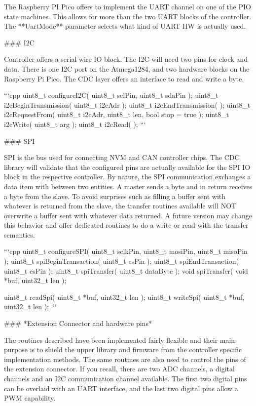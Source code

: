 The Raspberry PI Pico offers to implement the UART channel on one of the PIO state machines. This allows for more than the two UART blocks of the controller. The **UartMode** parameter selects what kind of UART HW is actually used.

### I2C

Controller offers a serial wire IO block. The I2C will need two pins for clock and data. There is one I2C port on the Atmega1284, and two hardware blocks on the Raspberry Pi Pico. The CDC layer offers an interface to read and write a byte.

```cpp
   uint8_t       configureI2C( uint8_t sclPin, uint8_t sdaPin );
   uint8_t       i2cBeginTransmission( uint8_t i2cAdr );
   uint8_t       i2cEndTransmission( );
   uint8_t       i2cRequestFrom( uint8_t i2cAdr, uint8_t len, bool stop = true );
   uint8_t       i2cWrite( uint8_t arg );
   uint8_t       i2cRead( );
```

### SPI

SPI is the bus used for connecting NVM and CAN controller chips. The CDC library will validate that the configured pins are actually available for the SPI IO block in the respective controller. By nature, the SPI communication exchanges a data item with between two entities. A master sends a byte and in return receives a byte from the slave. To avoid surprises such as filling a buffer sent with whatever is returned from the slave, the transfer routines available will NOT overwrite a buffer sent with whatever data returned. A future version may change this behavior and offer dedicated routines to do a write or read with the transfer semantics.

```cpp
   uint8_t       configureSPI( uint8_t sclkPin, uint8_t mosiPin, uint8_t misoPin );
   uint8_t       spiBeginTransaction( uint8_t csPin );
   uint8_t       spiEndTransaction( uint8_t csPin );
   uint8_t       spiTransfer( uint8_t dataByte );
   void          spiTransfer( void *buf, uint32_t len );

   uint8_t       readSpi( uint8_t *buf, uint32_t len );
   uint8_t       writeSpi( uint8_t *buf, uint32_t len );
```



### *Extension Connector and hardware pins*

The routines described have been implemented fairly flexible and their main purpose is to shield the upper library and firmware from the controller specific implementation methods. The same routines are also used to control the pins of the extension connector. If you recall, there are two ADC channels, a digital channels and an I2C communication channel available. The first two digital pins can be overlaid with an UART interface, and the last two digital pins allow a PWM capability.

